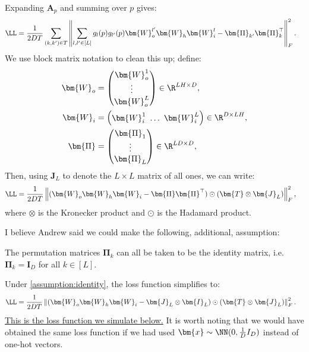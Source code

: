 \documentclass{article}
\begin{document}
Expanding $\bm{A}_p$ and summing over $p$ gives:
\begin{align*}
    \LL
    &= \frac{1}{2DT} \sum_{(k,k') \in T} \left\Vert \sum_{l,l' \in [L]} g_l(p) g_{l'}(p) \bm{W}_o^{l'} \bm{W}_h \bm{W}_i^l - \bm{\Pi}_{k'} \bm{\Pi}_k^\top \right\Vert_F^2.
\end{align*}
We use block matrix notation to clean this up; define:
\begin{align*}
    \bm{W}_o &= \begin{pmatrix} \bm{W}_o^1 \\ \vdots \\ \bm{W}_o^L \end{pmatrix} \in \R^{L H \times D}, \\
    \bm{W}_i &= \begin{pmatrix} \bm{W}_i^1 \ \hdots \ \bm{W}_i^L \end{pmatrix} \in \R^{D \times L H}, \\
    \bm{\Pi} &= \begin{pmatrix} \bm{\Pi}_1 \\ \vdots \\ \bm{\Pi}_L \end{pmatrix} \in \R^{L D \times D}, \\
\end{align*}
Then, using $\bm{J}_L$ to denote the $L \times L$ matrix of all ones, we can write:
\begin{align*}
    \LL
    &= \frac{1}{2DT} \left\Vert ( \bm{W}_o \bm{W}_h \bm{W}_i - \bm{\Pi} \bm{\Pi}^\top ) \odot ( \bm{T} \otimes \bm{J}_L ) \right\Vert_F^2,
\end{align*}
where $\otimes$ is the Kronecker product and $\odot$ is the Hadamard product.

I believe Andrew said we could make the following, additional, assumption:
\begin{assumption} \label{assumption:identity}
    The permutation matrices $\bm{\Pi}_k$ can all be taken to be the identity matrix, i.e. $\bm{\Pi}_k = \bm{I}_D$ for all $k \in [L]$.
\end{assumption}
Under \cref{assumption:identity}, the loss function simplifies to:
\begin{align}
    \LL
    &= \frac{1}{2DT} \left\Vert ( \bm{W}_o \bm{W}_h \bm{W}_i - \bm{J}_L \otimes \bm{I}_L ) \odot ( \bm{T} \otimes \bm{J}_L ) \right\Vert_F^2.
    \label{eq:loss}
\end{align}
\underline{This is the loss function we simulate below.}
It is worth noting that we would have obtained the same loss function if we had used $\bm{x} \sim \NN(0, \frac{1}{D} I_D)$ instead of one-hot vectors.
\end{document}
